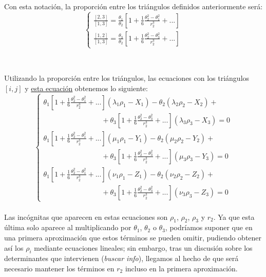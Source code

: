 \documentclass[11pt]{article}
\begin{document}
Con esta notación, la proporción entre los triángulos definidos anteriormente será:
\[
\left\{
\begin{array}{l}
	\frac{[2,3]}{[1,3]}=\frac{\theta_1}{\theta_2}[1+\frac{1}{6}\frac{\theta_2^2-\theta_1^2}{r_2^3}+...]\\
	\frac{[1,2]}{[1,3]}=\frac{\theta_3}{\theta_2}[1+\frac{1}{6}\frac{\theta_2^2-\theta_3^2}{r_2^3}+...]
\end{array}
\right.
\]\\

\subsection{}
Utilizando la proporción entre los triángulos, las ecuaciones con los triángulos $[i,j]$ y \hyperref[eq:relacion_C_S_E]{esta ecuación} obtenemos lo siguiente:
\[
\left\{
\begin{array}{l}
	\theta_1[1+\frac{1}{6}\frac{\theta_2^2-\theta_1^2}{r_2^3}+...] (\lambda_1\rho_1-X_1)-\theta_2(\lambda_2\rho_2-X_2)+\\ \; \; \; \; \; \; \; \; \; \; \; \; \; \; \; \; \; \; \; \; \; \; \; \; \; \; \; \; \; +\theta_3[1+\frac{1}{6}\frac{\theta_2^2-\theta_3^2}{r_2^3}+...] (\lambda_3\rho_3-X_3)=0\\

	\theta_1[1+\frac{1}{6}\frac{\theta_2^2-\theta_1^2}{r_2^3}+...] (\mu_1\rho_1-Y_1)-\theta_2(\mu_2\rho_2-Y_2)+\\ \; \; \; \; \; \; \; \; \; \; \; \; \; \; \; \; \; \; \; \; \; \; \; \; \; \; \; \; \; +\theta_3[1+\frac{1}{6}\frac{\theta_2^2-\theta_3^2}{r_2^3}+...] (\mu_3\rho_3-Y_3)=0\\

	\theta_1[1+\frac{1}{6}\frac{\theta_2^2-\theta_1^2}{r_2^3}+...] (\nu_1\rho_1-Z_1)-\theta_2(\nu_2\rho_2-Z_2)+\\ \; \; \; \; \; \; \; \; \; \; \; \; \; \; \; \; \; \; \; \; \; \; \; \; \; \; \; \; \; +\theta_3[1+\frac{1}{6}\frac{\theta_2^2-\theta_3^2}{r_2^3}+...] (\nu_3\rho_3-Z_3)=0
\end{array}
\right.
\]\\

Las incógnitas que aparecen en estas ecuaciones son $\rho_1$, $\rho_2$, $\rho_3$ y $r_2$. Ya que esta última solo aparece al multiplicando por $\theta_1$, $\theta_2$ o $\theta_3$, podríamos suponer que en una primera aproximación que estos términos se pueden omitir, pudiendo obtener así los $\rho_i$ mediante ecuaciones lineales; sin embargo, tras un discusión sobre los determinantes que intervienen (\textit{buscar info}), llegamos al hecho de que será necesario mantener los términos en $r_2$ incluso en la primera aproximación.\\
\end{document}
